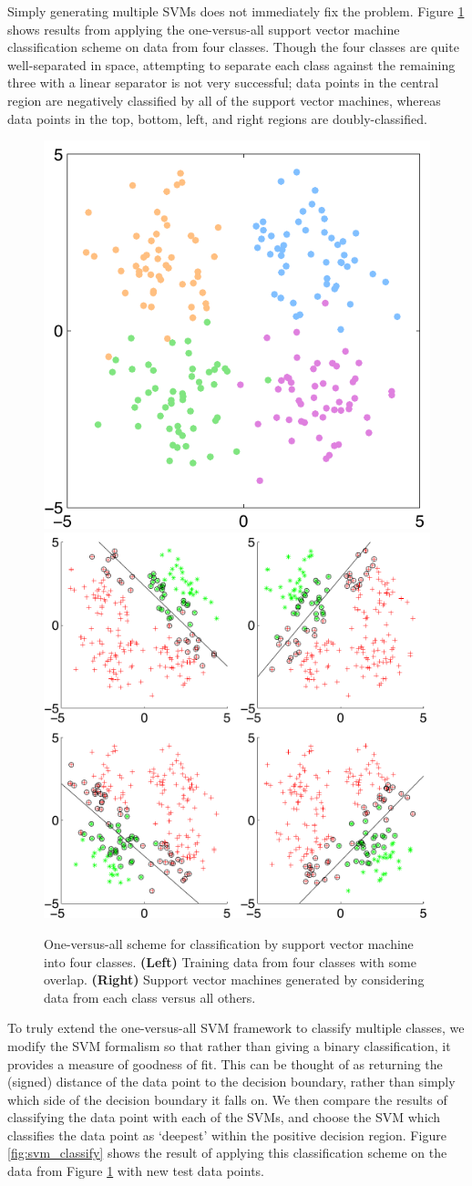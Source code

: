 \documentclass[12pt]{article}
\newcommand{\figlabel}[1]{\textbf{(#1)}}
\begin{document}
Simply generating multiple SVMs does not immediately fix the problem. Figure \ref{fig:svm_training} shows results from applying the one-versus-all support vector machine classification scheme on data from four classes. Though the four classes are quite well-separated in space, attempting to separate each class against the remaining three with a linear separator is not very successful; data points in the central region are negatively classified by all of the support vector machines, whereas data points in the top, bottom, left, and right regions are doubly-classified.
\begin{figure}[H]
\centering
\includegraphics[width=.48\textwidth]{figures/svm_trainingdata}
\includegraphics[width=.48\textwidth]{figures/svm_multiplesvms}
\caption{One-versus-all scheme for classification by support vector machine into four classes. \figlabel{Left} Training data from four classes with some overlap. \figlabel{Right} Support vector machines generated by considering data from each class versus all others.}
\label{fig:svm_training}
\end{figure}
To truly extend the one-versus-all SVM framework to classify multiple classes, we modify the SVM formalism so that rather than giving a binary classification, it provides a measure of goodness of fit. This can be thought of as returning the (signed) distance of the data point to the decision boundary, rather than simply which side of the decision boundary it falls on. We then compare the results of classifying the data point with each of the SVMs, and choose the SVM which classifies the data point as `deepest' within the positive decision region. Figure \ref{fig:svm_classify} shows the result of applying this classification scheme on the data from Figure \ref{fig:svm_training} with new test data points. 
\end{document}
